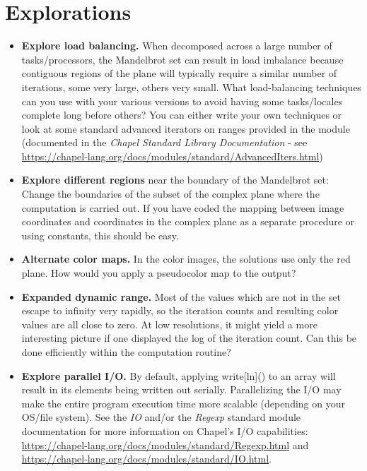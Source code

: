 \documentclass[10pt]{article}
\begin{document}
\bigskip
\bigskip

\section*{Explorations}

\begin{itemize}

\item {\bf Explore load balancing.} When decomposed across a large
  number of tasks/processors, the Mandelbrot set can result in load
  imbalance because contiguous regions of the plane will typically
  require a similar number of iterations, some very large, others very
  small.  What load-balancing techniques can you use with your various
  versions to avoid having some tasks/locales complete long before
  others?  You can either write your own techniques or look at some
  standard advanced iterators on ranges provided in the
   module (documented in the \emph{Chapel Standard
  Library Documentation} - see
  \url{https://chapel-lang.org/docs/modules/standard/AdvancedIters.html})

\item {\bf Explore different regions} near the boundary of the
  Mandelbrot set: Change the boundaries of the subset of the complex
  plane where the computation is carried out.  If you have coded the
  mapping between image coordinates and coordinates in the complex
  plane as a separate procedure or using constants, this should be
  easy.

\item {\bf Alternate color maps.} In the color images, the solutions
  use only the red plane.  How would you apply a pseudocolor map to
  the output?

\item {\bf Expanded dynamic range.} Most of the values which are not
  in the set escape to infinity very rapidly, so the iteration counts
  and resulting color values are all close to zero.  At low
  resolutions, it might yield a more interesting picture if one
  displayed the log of the iteration count.  Can this be done
  efficiently within the computation routine?

\item {\bf Explore parallel I/O.} By default, applying write[ln]() to
  an array will result in its elements being written out serially.
  Parallelizing the I/O may make the entire program execution time
  more scalable (depending on your OS/file system).  See the
  \emph{IO} and/or the \emph{Regexp} standard module documentation
  for more information on Chapel's I/O capabilities:
  \url{https://chapel-lang.org/docs/modules/standard/Regexp.html}
  and
  \url{https://chapel-lang.org/docs/modules/standard/IO.html}.

\end{itemize}
\end{document}
